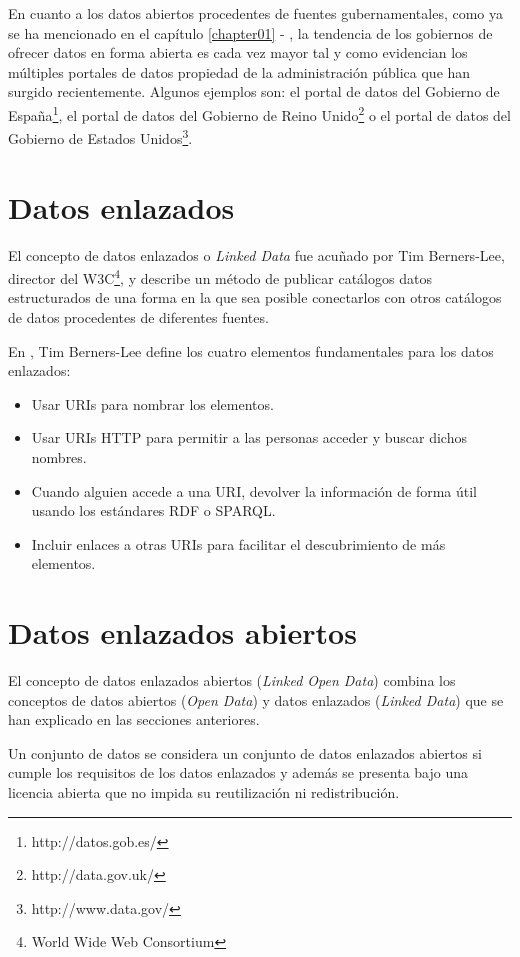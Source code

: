 En cuanto a los datos abiertos procedentes de fuentes gubernamentales, como ya se ha mencionado en el capítulo \ref{chapter01} - , la tendencia de los gobiernos de ofrecer datos en forma abierta es cada vez mayor tal y como evidencian los múltiples portales de datos propiedad de la administración pública que han surgido recientemente. Algunos ejemplos son: el portal de datos del Gobierno de España\footnote{http://datos.gob.es/}, el portal de datos del Gobierno de Reino Unido\footnote{http://data.gov.uk/} o el portal de datos del Gobierno de Estados Unidos\footnote{http://www.data.gov/}.



\section{Datos enlazados}
El concepto de datos enlazados o \textit{Linked Data} fue acuñado por Tim Berners-Lee, director del W3C\footnote{World Wide Web Consortium}, y describe un método de publicar catálogos datos estructurados de una forma en la que sea posible conectarlos con otros catálogos de datos procedentes de diferentes fuentes.

En \cite{tbl-linkedopendata}, Tim Berners-Lee define los cuatro elementos fundamentales para los datos enlazados:
\begin{itemize}
\item Usar URIs para nombrar los elementos.
\item Usar URIs HTTP para permitir a las personas acceder y buscar dichos nombres.
\item Cuando alguien accede a una URI, devolver la información de forma útil usando los estándares RDF o SPARQL.
\item Incluir enlaces a otras URIs para facilitar el descubrimiento de más elementos.
\end{itemize}



\section{Datos enlazados abiertos}
El concepto de datos enlazados abiertos (\textit{Linked Open Data}) combina los conceptos de datos abiertos (\textit{Open Data}) y datos enlazados (\textit{Linked Data}) que se han explicado en las secciones anteriores.

Un conjunto de datos se considera un conjunto de datos enlazados abiertos si cumple los requisitos de los datos enlazados y además se presenta bajo una licencia abierta que no impida su reutilización ni redistribución.


